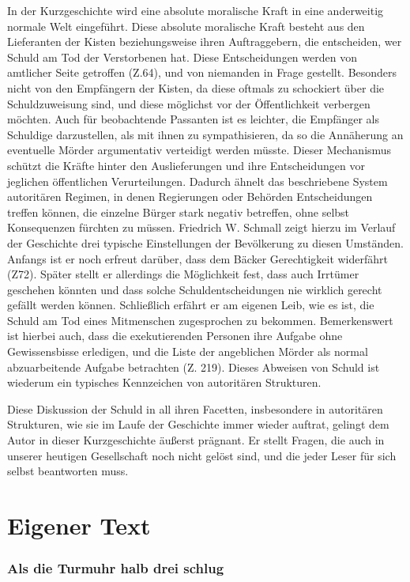 In der Kurzgeschichte wird eine absolute moralische Kraft in eine anderweitig normale Welt eingeführt. Diese absolute moralische Kraft besteht aus den Lieferanten der Kisten beziehungsweise ihren Auftraggebern, die entscheiden, wer Schuld am Tod der Verstorbenen hat. Diese Entscheidungen werden von amtlicher Seite getroffen (Z.64), und von niemanden in Frage gestellt. Besonders nicht von den Empfängern der Kisten, da diese oftmals zu schockiert über die Schuldzuweisung sind, und diese möglichst vor der Öffentlichkeit verbergen möchten. Auch für beobachtende Passanten ist es leichter, die Empfänger als Schuldige darzustellen, als mit ihnen zu sympathisieren, da so die Annäherung an eventuelle Mörder argumentativ verteidigt werden müsste. Dieser Mechanismus schützt die Kräfte hinter den Auslieferungen und ihre Entscheidungen vor jeglichen öffentlichen Verurteilungen. Dadurch ähnelt das beschriebene System autoritären Regimen, in denen Regierungen oder Behörden Entscheidungen treffen können, die einzelne Bürger stark negativ betreffen, ohne selbst Konsequenzen fürchten zu müssen. Friedrich W. Schmall zeigt hierzu im Verlauf der Geschichte drei typische Einstellungen der Bevölkerung zu diesen Umständen. Anfangs ist er noch erfreut darüber, dass dem Bäcker Gerechtigkeit widerfährt (Z72). Später stellt er allerdings die Möglichkeit fest, dass auch Irrtümer geschehen könnten und dass solche Schuldentscheidungen nie wirklich gerecht gefällt werden können. Schließlich erfährt er am eigenen Leib, wie es ist, die Schuld am Tod eines Mitmenschen zugesprochen zu bekommen. Bemerkenswert ist hierbei auch, dass die exekutierenden Personen ihre Aufgabe ohne Gewissensbisse erledigen, und die Liste der angeblichen Mörder als normal abzuarbeitende Aufgabe betrachten (Z. 219). Dieses Abweisen von Schuld ist wiederum ein typisches Kennzeichen von autoritären Strukturen. 

Diese Diskussion der Schuld in all ihren Facetten, insbesondere in autoritären Strukturen, wie sie im Laufe der Geschichte immer wieder auftrat, gelingt dem Autor in dieser Kurzgeschichte äußerst prägnant. Er stellt Fragen, die auch in unserer heutigen Gesellschaft noch nicht gelöst sind, und die jeder Leser für sich selbst beantworten muss. 

\section{Eigener Text}
\subsubsection{Als die Turmuhr halb drei schlug}

